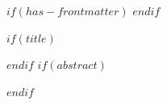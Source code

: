 $if(has-frontmatter)$
\frontmatter
$endif$
\author{%
  {\large\bfseries Cherrie Chang (cherriechang15@gmail.com)\textsuperscript{1} \& Tianyi Li\textsuperscript{2} \& Joshua Hartshorne\textsuperscript{1}} \\
  {\normalsize\normalfont
    \textsuperscript{1}Department of Communication Sciences \& Disorders, MGH Institute of Health Professions \\
    \textsuperscript{2}Department of Psychology \& Neuroscience, Boston College
  }%
}
$if(title)$
\maketitle
$endif$
$if(abstract)$
\begin{abstract}
$abstract$

\end{abstract}
$endif$
